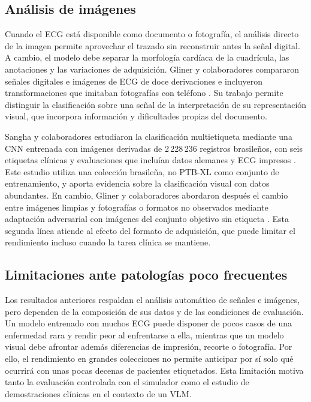 \subsection{Análisis de imágenes}

Cuando el ECG está disponible como documento o fotografía, el análisis directo de la imagen permite aprovechar el trazado sin reconstruir antes la señal digital. A cambio, el modelo debe separar la morfología cardíaca de la cuadrícula, las anotaciones y las variaciones de adquisición. Gliner y colaboradores compararon señales digitales e imágenes de ECG de doce derivaciones e incluyeron transformaciones que imitaban fotografías con teléfono \cite{gliner2020}. Su trabajo permite distinguir la clasificación sobre una señal de la interpretación de su representación visual, que incorpora información y dificultades propias del documento.

Sangha y colaboradores estudiaron la clasificación multietiqueta mediante una CNN entrenada con imágenes derivadas de 2\,228\,236 registros brasileños, con seis etiquetas clínicas y evaluaciones que incluían datos alemanes y ECG impresos \cite{sangha2022}. Este estudio utiliza una colección brasileña, no PTB-XL como conjunto de entrenamiento, y aporta evidencia sobre la clasificación visual con datos abundantes. En cambio, Gliner y colaboradores abordaron después el cambio entre imágenes limpias y fotografías o formatos no observados mediante adaptación adversarial con imágenes del conjunto objetivo sin etiqueta \cite{gliner2023}. Esta segunda línea atiende al efecto del formato de adquisición, que puede limitar el rendimiento incluso cuando la tarea clínica se mantiene.

\subsection{Limitaciones ante patologías poco frecuentes}

Los resultados anteriores respaldan el análisis automático de señales e imágenes, pero dependen de la composición de sus datos y de las condiciones de evaluación. Un modelo entrenado con muchos ECG puede disponer de pocos casos de una enfermedad rara y rendir peor al enfrentarse a ella, mientras que un modelo visual debe afrontar además diferencias de impresión, recorte o fotografía. Por ello, el rendimiento en grandes colecciones no permite anticipar por sí solo qué ocurrirá con unas pocas decenas de pacientes etiquetados. Esta limitación motiva tanto la evaluación controlada con el simulador como el estudio de demostraciones clínicas en el contexto de un VLM.

